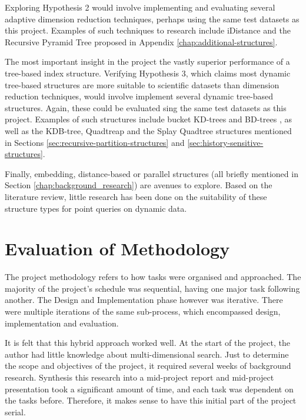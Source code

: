 Exploring Hypothesis 2 would involve implementing and evaluating several adaptive dimension reduction techniques, perhaps using the same test datasets as this project. Examples of such techniques to research include iDistance \cite{idistance} and the Recursive Pyramid Tree proposed in Appendix \ref{chap:additional-structures}.

The most important insight in the project the vastly superior performance of a tree-based index structure. Verifying Hypothesis 3, which claims most dynamic tree-based structures are more suitable to scientific datasets than dimension reduction techniques, would involve implement several dynamic tree-based structures. Again, these could be evaluated sing the same test datasets as this project. Examples of such structures include bucket KD-trees and BD-trees \cite{kdtree-v-bdtree}, as well as the KDB-tree, Quadtreap and the Splay Quadtree structures mentioned in Sections \ref{sec:recursive-partition-structures} and \ref{sec:history-sensitive-structures}.

Finally, embedding, distance-based or parallel structures (all briefly mentioned in Section \ref{chap:background_research}) are avenues to explore. Based on the literature review, little research has been done on the suitability of these structure types for point queries on dynamic data.

\section{Evaluation of Methodology}

The project methodology refers to how tasks were organised and approached. The majority of the project's schedule was sequential, having one major task following another. The Design and Implementation phase however was iterative. There were multiple iterations of the same sub-process, which encompassed design, implementation and evaluation. 

It is felt that this hybrid approach worked well. At the start of the project, the author had little knowledge about multi-dimensional search. Just to determine the scope and objectives of the project, it required several weeks of background research. Synthesis this research into a mid-project report and mid-project presentation took a significant amount of time, and each task was dependent on the tasks before. Therefore, it makes sense to have this initial part of the project serial.

